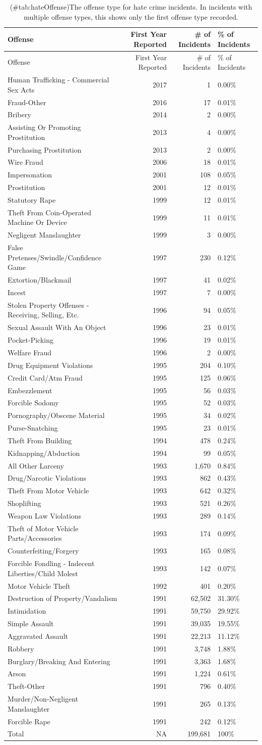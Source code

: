 \documentclass[
  12pt,
  openany]{book}
\begin{document}
\begin{longtable}[]{@{}lrrl@{}}
\caption{(\#tab:hateOffense)The offense type for hate crime incidents. In incidents with multiple offense types, this shows only the first offense type recorded.}\tabularnewline
\toprule
Offense & First Year Reported & \# of Incidents & \% of Incidents\tabularnewline
\midrule
\endfirsthead
\toprule
Offense & First Year Reported & \# of Incidents & \% of Incidents\tabularnewline
\midrule
\endhead
Human Trafficking - Commercial Sex Acts & 2017 & 1 & 0.00\%\tabularnewline
Fraud-Other & 2016 & 17 & 0.01\%\tabularnewline
Bribery & 2014 & 2 & 0.00\%\tabularnewline
Assisting Or Promoting Prostitution & 2013 & 4 & 0.00\%\tabularnewline
Purchasing Prostitution & 2013 & 2 & 0.00\%\tabularnewline
Wire Fraud & 2006 & 18 & 0.01\%\tabularnewline
Impersonation & 2001 & 108 & 0.05\%\tabularnewline
Prostitution & 2001 & 12 & 0.01\%\tabularnewline
Statutory Rape & 1999 & 12 & 0.01\%\tabularnewline
Theft From Coin-Operated Machine Or Device & 1999 & 11 & 0.01\%\tabularnewline
Negligent Manslaughter & 1999 & 3 & 0.00\%\tabularnewline
False Pretenses/Swindle/Confidence Game & 1997 & 230 & 0.12\%\tabularnewline
Extortion/Blackmail & 1997 & 41 & 0.02\%\tabularnewline
Incest & 1997 & 7 & 0.00\%\tabularnewline
Stolen Property Offenses - Receiving, Selling, Etc. & 1996 & 94 & 0.05\%\tabularnewline
Sexual Assault With An Object & 1996 & 23 & 0.01\%\tabularnewline
Pocket-Picking & 1996 & 19 & 0.01\%\tabularnewline
Welfare Fraud & 1996 & 2 & 0.00\%\tabularnewline
Drug Equipment Violations & 1995 & 204 & 0.10\%\tabularnewline
Credit Card/Atm Fraud & 1995 & 125 & 0.06\%\tabularnewline
Embezzlement & 1995 & 56 & 0.03\%\tabularnewline
Forcible Sodomy & 1995 & 52 & 0.03\%\tabularnewline
Pornography/Obscene Material & 1995 & 34 & 0.02\%\tabularnewline
Purse-Snatching & 1995 & 23 & 0.01\%\tabularnewline
Theft From Building & 1994 & 478 & 0.24\%\tabularnewline
Kidnapping/Abduction & 1994 & 99 & 0.05\%\tabularnewline
All Other Larceny & 1993 & 1,670 & 0.84\%\tabularnewline
Drug/Narcotic Violations & 1993 & 862 & 0.43\%\tabularnewline
Theft From Motor Vehicle & 1993 & 642 & 0.32\%\tabularnewline
Shoplifting & 1993 & 521 & 0.26\%\tabularnewline
Weapon Law Violations & 1993 & 289 & 0.14\%\tabularnewline
Theft of Motor Vehicle Parts/Accessories & 1993 & 174 & 0.09\%\tabularnewline
Counterfeiting/Forgery & 1993 & 165 & 0.08\%\tabularnewline
Forcible Fondling - Indecent Liberties/Child Molest & 1993 & 142 & 0.07\%\tabularnewline
Motor Vehicle Theft & 1992 & 401 & 0.20\%\tabularnewline
Destruction of Property/Vandalism & 1991 & 62,502 & 31.30\%\tabularnewline
Intimidation & 1991 & 59,750 & 29.92\%\tabularnewline
Simple Assault & 1991 & 39,035 & 19.55\%\tabularnewline
Aggravated Assault & 1991 & 22,213 & 11.12\%\tabularnewline
Robbery & 1991 & 3,748 & 1.88\%\tabularnewline
Burglary/Breaking And Entering & 1991 & 3,363 & 1.68\%\tabularnewline
Arson & 1991 & 1,224 & 0.61\%\tabularnewline
Theft-Other & 1991 & 796 & 0.40\%\tabularnewline
Murder/Non-Negligent Manslaughter & 1991 & 265 & 0.13\%\tabularnewline
Forcible Rape & 1991 & 242 & 0.12\%\tabularnewline
Total & NA & 199,681 & 100\%\tabularnewline
\bottomrule
\end{longtable}
\end{document}
